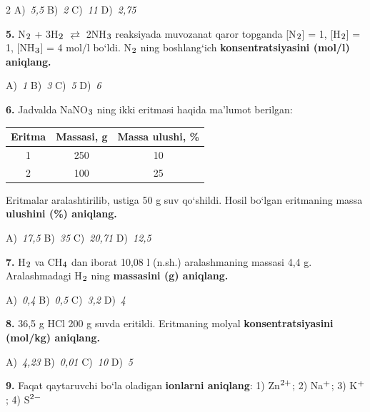 \documentclass[11pt,a4paper]{article}
\renewcommand{\textsubscript}[1]{\ensuremath{_{\text{\fontsize{8}{8}\selectfont #1}}}}
\renewcommand{\textsuperscript}[1]{\ensuremath{^{\text{\fontsize{8}{8}\selectfont #1}}}}
\begin{document}
\begin{multicols}{2}
\noindent A)~\textsl{5,5} \hfill B)~\textsl{2} \hfill C)~\textsl{11} \hfill D)~\textsl{2,75}\par
\vspace{4pt}
\noindent\textbf{5.} N\textsubscript{2} + 3H\textsubscript{2} $\rightleftarrows$ 2NH\textsubscript{3} reaksiyada muvozanat qaror topganda [N\textsubscript{2}] = 1, [H\textsubscript{2}] = 1, [NH\textsubscript{3}] = 4 mol/l bo`ldi. N\textsubscript{2} ning boshlang`ich \textbf{konsentratsiyasini (mol/l) aniqlang.}

\noindent A)~\textsl{1} \hfill B)~\textsl{3} \hfill C)~\textsl{5} \hfill D)~\textsl{6}\par
\vspace{4pt}
\noindent\textbf{6.} Jadvalda NaNO\textsubscript{3} ning ikki eritmasi haqida ma'lumot berilgan:
\begin{center}
\renewcommand{\arraystretch}{1.15}
\begin{tabular}{|c|c|c|}\hline
\textbf{Eritma} & \textbf{Massasi, g} & \textbf{Massa ulushi, \%} \\ \hline
1 & 250 & 10 \\ \hline
2 & 100 & 25 \\ \hline
\end{tabular}
\end{center}
Eritmalar aralashtirilib, ustiga 50 g suv qo`shildi. Hosil bo`lgan eritmaning massa \textbf{ulushini (\%) aniqlang.}

\noindent A)~\textsl{17,5} \hfill B)~\textsl{35} \hfill C)~\textsl{20,71} \hfill D)~\textsl{12,5}\par
\vspace{4pt}
\noindent\textbf{7.} H\textsubscript{2} va CH\textsubscript{4} dan iborat 10,08 l (n.sh.) aralashmaning massasi 4,4 g. Aralashmadagi H\textsubscript{2} ning \textbf{massasini (g) aniqlang.}

\noindent A)~\textsl{0,4} \hfill B)~\textsl{0,5} \hfill C)~\textsl{3,2} \hfill D)~\textsl{4}\par
\vspace{4pt}
\noindent\textbf{8.} 36,5 g HCl 200 g suvda eritildi. Eritmaning molyal \textbf{konsentratsiyasini (mol/kg) aniqlang.}

\noindent A)~\textsl{4,23} \hfill B)~\textsl{0,01} \hfill C)~\textsl{10} \hfill D)~\textsl{5}\par
\vspace{4pt}
\noindent\textbf{9.} Faqat qaytaruvchi bo`la oladigan \textbf{ionlarni aniqlang}: 1) Zn\textsuperscript{2+}; 2) Na\textsuperscript{+}; 3) K\textsuperscript{+}; 4) S\textsuperscript{2$-$}


\end{multicols}
\end{document}
